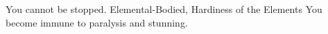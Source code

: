 \shortdescfeat
{You cannot be stopped.}
{Elemental-Bodied, Hardiness of the Elements}
{You become immune to paralysis and stunning.}